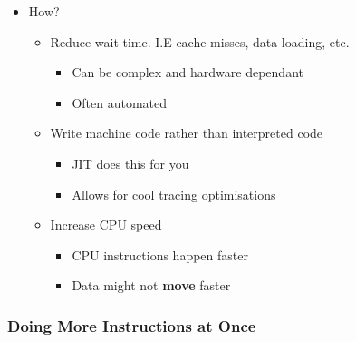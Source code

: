 \begin{itemize}
\itemsep1pt\parskip0pt
\item
  How?

  \begin{itemize}
  \itemsep1pt\parskip0pt
  \item
    Reduce wait time. I.E cache misses, data loading, etc.

    \begin{itemize}
    \itemsep1pt\parskip0pt
    \item
      Can be complex and hardware dependant
    \item
      Often automated
    \end{itemize}
  \item
    Write machine code rather than interpreted code

    \begin{itemize}
    \itemsep1pt\parskip0pt
    \item
      JIT does this for you
    \item
      Allows for cool tracing optimisations
    \end{itemize}
  \item
    Increase CPU speed

    \begin{itemize}
    \itemsep1pt\parskip0pt
    \item
      CPU instructions happen faster
    \item
      Data might not \textbf{move} faster
    \end{itemize}
  \end{itemize}
\end{itemize}

\subsubsection{Doing More Instructions at
Once}\label{doing-more-instructions-at-once}

